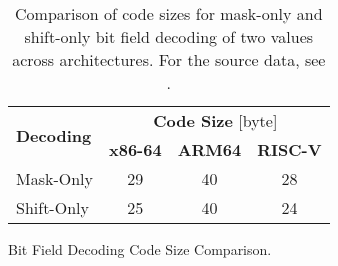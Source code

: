 \begin{table}[htb]
  \centering
  \begin{tabular}{l c c c}
    \toprule
    \multirow{2}{*}[-2pt]{\textbf{Decoding}} & \multicolumn{3}{c}{\textbf{Code Size} [byte]}\\
    \cmidrule{2-4}
    & \textbf{x86-64} & \textbf{ARM64} & \textbf{RISC-V}\\
    \midrule
    Mask-Only & 29 & 40 & 28\\
    Shift-Only & 25 & 40 & 24\\
    \bottomrule
  \end{tabular}
  \caption{Bit Field Decoding Code Size Comparison.}
  \label{fig:field_dec_sizes}
  \caption*{Comparison of code sizes for mask-only and shift-only bit field decoding of two values across architectures. For the source data, see .}
\end{table}
